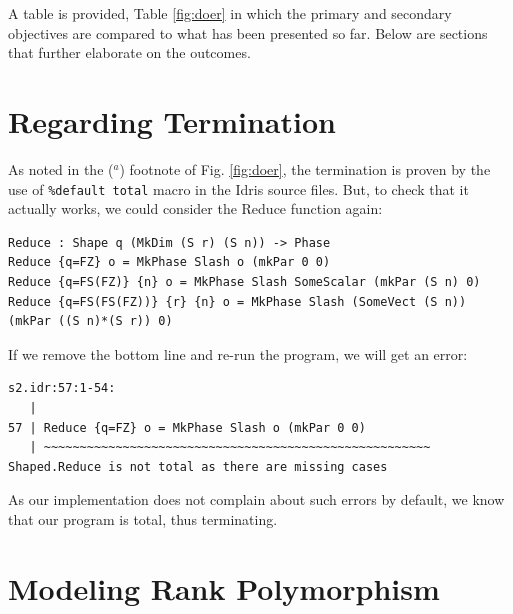 \documentclass{report}
\begin{document}
A table is provided, Table \ref{fig:doer} in which the primary and secondary objectives are compared to what has been presented so far. Below are sections that further elaborate on the outcomes.

\section{Regarding Termination}
\label{sc:temination}

As noted in the ($^{a}$) footnote of Fig. \ref{fig:doer}, the termination is proven by the use of \verb|%default total| macro in the Idris source files. But, to check that it actually works, we could consider the Reduce function again:

\begin{verbatim}
Reduce : Shape q (MkDim (S r) (S n)) -> Phase
Reduce {q=FZ} o = MkPhase Slash o (mkPar 0 0)
Reduce {q=FS(FZ)} {n} o = MkPhase Slash SomeScalar (mkPar (S n) 0)
Reduce {q=FS(FS(FZ))} {r} {n} o = MkPhase Slash (SomeVect (S n)) (mkPar ((S n)*(S r)) 0)
\end{verbatim}

If we remove the bottom line and re-run the program, we will get an error:

\begin{verbatim}
s2.idr:57:1-54:
   |
57 | Reduce {q=FZ} o = MkPhase Slash o (mkPar 0 0)
   | ~~~~~~~~~~~~~~~~~~~~~~~~~~~~~~~~~~~~~~~~~~~~~~~~~~~~~~
Shaped.Reduce is not total as there are missing cases    
\end{verbatim}

As our implementation does not complain about such errors by default, we know that our program is total, thus terminating.

\section{Modeling Rank Polymorphism}
\label{sc:rankpolym}
\end{document}
